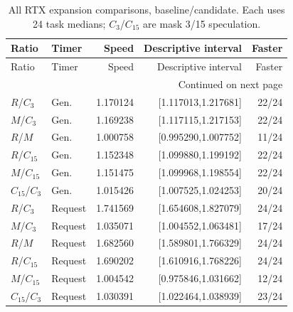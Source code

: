 \begingroup\small
\begin{longtable}{@{}llrrr@{}}
\caption{All RTX expansion comparisons, baseline/candidate. Each uses 24 task medians; $C_3$/$C_{15}$ are mask 3/15 speculation.}\label{tab:rtx_all}\\
\toprule
Ratio & Timer & Speed & Descriptive interval & Faster\\\midrule
\endfirsthead
\toprule
Ratio & Timer & Speed & Descriptive interval & Faster\\\midrule
\endhead
\midrule\multicolumn{5}{r}{Continued on next page}\\
\endfoot
\bottomrule
\endlastfoot
$R$/$C_3$ & Gen. & 1.170124 & [1.117013,1.217681] & 22/24\\
$M$/$C_3$ & Gen. & 1.169238 & [1.117115,1.217153] & 22/24\\
$R$/$M$ & Gen. & 1.000758 & [0.995290,1.007752] & 11/24\\
$R$/$C_{15}$ & Gen. & 1.152348 & [1.099880,1.199192] & 22/24\\
$M$/$C_{15}$ & Gen. & 1.151475 & [1.099968,1.198554] & 22/24\\
$C_{15}$/$C_3$ & Gen. & 1.015426 & [1.007525,1.024253] & 20/24\\
$R$/$C_3$ & Request & 1.741569 & [1.654608,1.827079] & 24/24\\
$M$/$C_3$ & Request & 1.035071 & [1.004552,1.063481] & 17/24\\
$R$/$M$ & Request & 1.682560 & [1.589801,1.766329] & 24/24\\
$R$/$C_{15}$ & Request & 1.690202 & [1.610916,1.768226] & 24/24\\
$M$/$C_{15}$ & Request & 1.004542 & [0.975846,1.031662] & 12/24\\
$C_{15}$/$C_3$ & Request & 1.030391 & [1.022464,1.038939] & 23/24\\
\end{longtable}

\endgroup
